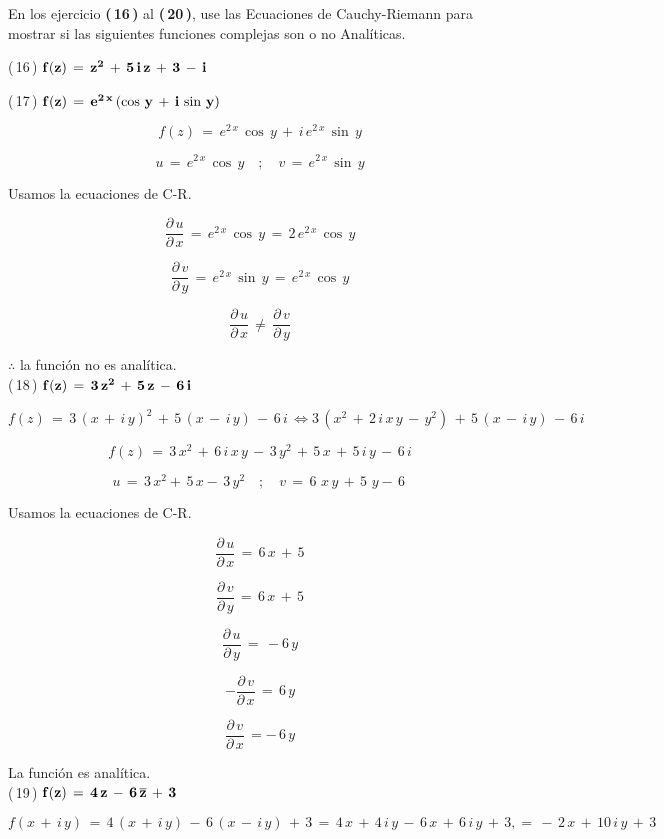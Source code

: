 \documentclass[a4paper,11pt,openany]{book}
\begin{document}
En los ejercicio \textbf{(\,16\,)} al \textbf{(\,20\,)}, use las Ecuaciones de Cauchy-Riemann para mostrar si las siguientes funciones complejas son o no Analíticas.

\textcolor{ao(english)}{(\,16\,)} $\bf{f(z)\,=\,z^{2}\,+\,5\,i\,z\,+\,3\,-\,i}$

\textcolor{ao(english)}{(\,17\,)} $\bf{f(z)\,=\,e^{2\,x}\,(\cos\,y\,+\,i\,\sin\,y)}$

$$f(z)\,=\,e^{2\,x}\,\cos\,y\,+\,i\,e^{2\,x}\,\sin\,y$$

$$u\,=\,e^{2\,x}\,\cos\,y \quad;\quad v\,=\,e^{2\,x}\,\sin\,y$$

\textcolor{ao(english)}{} Usamos la ecuaciones de C-R.

$$\dfrac{\partial\,u}{\partial\,x}\,=\,e^{2\,x}\,\cos\,y\,=\,2\,e^{2\,x}\,\cos\,y$$

$$\dfrac{\partial\,v}{\partial\,y}\,=\,e^{2\,x}\,\sin\,y\,=\,e^{2\,x}\,\cos\,y$$

$$\dfrac{\partial\,u}{\partial\,x}\,\neq\,\dfrac{\partial\,v}{\partial\,y}$$

$\therefore$ la función no es analítica.\\

\textcolor{ao(english)}{(\,18\,)} $\bf{f(z)\,=\,3\,z^{2}\,+\,5\,z\,-\,6\,i}$

$$f(z)\,=\,3\,(x\,+\,i\,y)^{2}\,+\,5\,(x\,-\,i\,y)\,-\,6\,i\,\iff 3\,(x^{2}\,+\,2\,i\,x\,y\,-\,y^{2})\,+\,5\,(x\,-\,i\,y)\,-\,6\,i\, $$  

$$f(z)\,= \,3\,x^{2}\,+\,6\,i\,x\,y\,-\,3\,y^{2}\,+\,5\,x\,+\,5\,i\,y\,-\,6\,i$$

$$u\,=\,3\,x^{2}+\,5\,x-\,3\,y^{2} \quad;\quad v\,=\,6\,\,x\,y\,+\,5\,\,y-\,6\,$$

\textcolor{ao(english)}{} Usamos la ecuaciones de C-R.

$$\dfrac{\partial\,u}{\partial\,x}\,=\,6\,x\,+\,5$$

$$\dfrac{\partial\,v}{\partial\,y}\,=\,6\,x\,+\,5$$

$$\dfrac{\partial\,u}{\partial\,y}\,=\,-6\,y$$

$$-\dfrac{\partial\,v}{\partial\,x}\,=\,6\,y$$

$$\dfrac{\partial\,v}{\partial\,x}\,=-\,6\,y$$

La función es analítica.\\

\textcolor{ao(english)}{(\,19\,)} $\bf{f(z)\,=\,4\,z\,-\,6\,\overline{z}\,+\,3}$

$$f(x\,+\,i\,y)\,=\,4\,(x\,+\,i\,y)\,-\,6\,(x\,-\,i\,y)\,+\,3\,=\,4\,x\,+\,4\,i\,y\,-\,6\,x\,+\,6\,i\,y\,+\,3,=\,-\,2\,x\,+\,10\,i\,y\,+\,3$$
\end{document}
